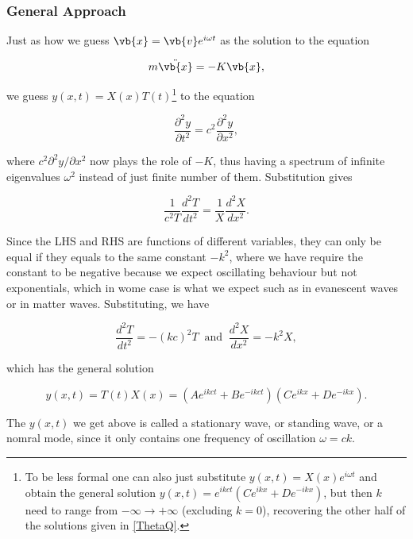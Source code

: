 \documentclass[a4paper,12pt]{report}
\begin{document}
\subsubsection{General Approach}

Just as how we guess \(\vb{x} = \vb{v} e^{i \omega t} \) as the solution to the equation

\begin{equation}
	m\ddot{\vb{x} } = -K\vb{x} ,  
\end{equation}

we guess \(y(x,t) = X(x)T(t)\)\footnote{To be less formal one can also just substitute \(y(x,t) = X(x)e^{i \omega t} \) and obtain the general solution \(y(x,t) = e^{ikct}(Ce^{ikx}+De^{-ikx})\), but then \(k\) need to range from \(- \infty \to + \infty\) (excluding \(k = 0\)), recovering the other half of the solutions given in \cref{ThetaQ}.} to the equation 

\begin{equation}
	\frac{\partial^2 y}{\partial t^2} = c^2 \frac{\partial^2 y}{\partial x^2}, 
\end{equation}

where \(c^2 \partial ^2 y/\partial x^2 \) now plays the role of \(-K\), thus having a spectrum of infinite eigenvalues \(\omega ^2\) instead of just finite number of them. Substitution gives

\begin{equation}
	\frac{1}{c^2 T} \frac{d^2T}{dt^2} = \frac{1}{X}\frac{d^2X}{dx^2}.
\end{equation}

Since the LHS and RHS are functions of different variables, they can only be equal if they equals to the same constant \(-k^2 \), where we have require the constant to be negative because we expect oscillating behaviour but not exponentials, which in wome case is what we expect such as in evanescent waves or in matter waves. Substituting, we have

\begin{equation}
	\frac{d^2T }{dt^2} = -(k c)^2T ~\text { and }~ \frac{d^2X}{dx^2} = -k ^2X,
\end{equation}

which has the general solution

\begin{equation}\label{ThetaQ}   
	y(x,t) = T(t)X(x) = \left( Ae^{ik ct}+Be^{-ik ct}    \right)\left( Ce^{i k x}+De^{-i k x}   \right). 
\end{equation}

The \(y(x,t)\) we get above is called a stationary wave, or standing wave, or a nomral mode, since it only contains one frequency of oscillation \(\omega = ck\). 
\end{document}
